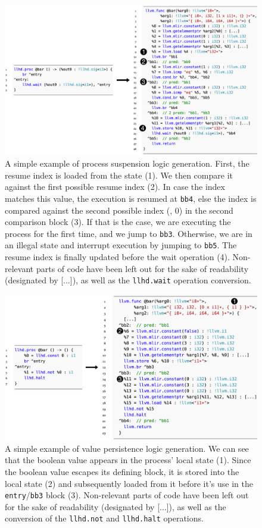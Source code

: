 \begin{figure}
    \centering
    \includegraphics[width=\textwidth]{gfx/Resumelow.png}
    \caption[A simple example of process suspension logic generation.]{A simple example of process suspension logic generation. First, the resume index is loaded from the state (1). We then compare it against the first possible resume index (2). In case the index matches this value, the execution is resumed at \texttt{bb4}, else the index is compared against the second possible index (\ie, $0$) in the second comparison block (3). If that is the case, we are executing the process for the first time, and we jump to \texttt{bb3}. Otherwise, we are in an illegal state and interrupt execution by jumping to \texttt{bb5}. The resume index is finally updated before the wait operation (4). Non-relevant parts of code have been left out for the sake of readability (designated by [...]), as well as the \texttt{llhd.wait} operation conversion.}
    \label{fig:proclow}
\end{figure}
\begin{figure}
    \centering
    \includegraphics[width=\textwidth]{gfx/Persistlow.png}
    \caption[A simple example of value persistence logic generation.]{
        A simple example of value persistence logic generation. We can see that the boolean value appears in the process' local state (1). Since the boolean value escapes its defining block, it is stored into the local state (2) and subsequently loaded from it before it's use in the \texttt{entry}/\texttt{bb3} block (3). Non-relevant parts of code have been left out for the sake of readability (designated by [...]), as well as the conversion of the \texttt{llhd.not} and \texttt{llhd.halt} operations.
    }
    \label{fig:persistlow}
\end{figure}

